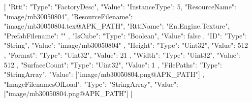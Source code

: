 [{
        "Rtti": {
            "Type": "FactoryDesc",
            "Value": {
                "InstanceType": 5,
                "ResourceName": "image/mb30050804",
                "ResourceFilename": "image/mb30050804.tex@APK_PATH",
                "RttiName": "En.Engine.Texture",
                "PrefabFilename": ""
            }
        },
        "IsCube": {
            "Type": "Boolean",
            "Value": false
        },
        "ID": {
            "Type": "String",
            "Value": "image/mb30050804"
        },
        "Height": {
            "Type": "Uint32",
            "Value": 512
        },
        "Format": {
            "Type": "Uint32",
            "Value": 21
        },
        "Width": {
            "Type": "Uint32",
            "Value": 512
        },
        "SurfaceCount": {
            "Type": "Uint32",
            "Value": 1
        },
        "FilePaths": {
            "Type": "StringArray",
            "Value": ["image/mb30050804.png@APK_PATH"]
        },
        "ImageFilenamesOfLoad": {
            "Type": "StringArray",
            "Value": ["image/mb30050804.png@APK_PATH"]
        }
    }]